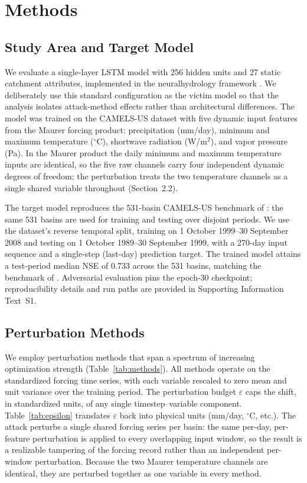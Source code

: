 \documentclass[final]{agujournal2019}
\begin{document}
\section{Methods}

\subsection{Study Area and Target Model}

We evaluate a single-layer LSTM model \cite{Kratzert2018} with 256 hidden units and 27 static catchment attributes, implemented in the neuralhydrology framework \cite{Kratzert2022}. We deliberately use this standard configuration as the victim model so that the analysis isolates attack-method effects rather than architectural differences. The model was trained on the CAMELS-US dataset \cite{Newman2015, Addor2017} with five dynamic input features from the Maurer forcing product: precipitation (mm/day), minimum and maximum temperature ($^\circ$C), shortwave radiation (W/m$^2$), and vapor pressure (Pa). In the Maurer product the daily minimum and maximum temperature inputs are identical, so the five raw channels carry four independent dynamic degrees of freedom; the perturbation treats the two temperature channels as a single shared variable throughout (Section~2.2).

The target model reproduces the 531-basin CAMELS-US benchmark of : the same 531 basins are used for training and testing over disjoint periods. We use the dataset's reverse temporal split, training on 1 October 1999--30 September 2008 and testing on 1 October 1989--30 September 1999, with a 270-day input sequence and a single-step (last-day) prediction target. The trained model attains a test-period median NSE of 0.733 across the 531 basins, matching the benchmark of . Adversarial evaluation pins the epoch-30 checkpoint; reproducibility details and run paths are provided in Supporting Information Text~S1.

\subsection{Perturbation Methods}

We employ perturbation methods that span a spectrum of increasing optimization strength (Table~\ref{tab:methods}). All methods operate on the standardized forcing time series, with each variable rescaled to zero mean and unit variance over the training period. The perturbation budget $\varepsilon$ caps the shift, in standardized units, of any single timestep--variable component. Table~\ref{tab:epsilon} translates $\varepsilon$ back into physical units (mm/day, $^\circ$C, etc.). The attack perturbs a single shared forcing series per basin: the same per-day, per-feature perturbation is applied to every overlapping input window, so the result is a realizable tampering of the forcing record rather than an independent per-window perturbation. Because the two Maurer temperature channels are identical, they are perturbed together as one variable in every method.
\end{document}
